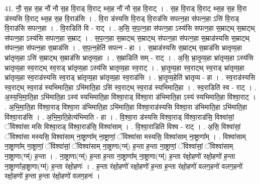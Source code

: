 \documentclass[17pt]{extarticle}
\begin{document}
41. नौ॒ स॒ह स॒ह नौ॑ नौ स॒ह वि॒राड् वि॒राट् थ्स॒ह नौ॑ नौ स॒ह वि॒राट् । . स॒ह वि॒राड् वि॒राट् थ्स॒ह स॒ह वि॒रा ड॑स्यसि वि॒राट् थ्स॒ह स॒ह वि॒राड॑सि । . वि॒रा ड॑स्यसि वि॒राड् वि॒राड॑सि सपत्न॒हा स॑पत्न॒हा ऽसि॑ वि॒राड् वि॒राड॑सि सपत्न॒हा । . वि॒राडिति॑ वि - राट् । . अ॒सि॒ स॒प॒त्न॒हा स॑पत्न॒हा ऽस्य॑सि सपत्न॒हा स॒म्राट्थ् स॒म्राट्थ् स॑पत्न॒हा ऽस्य॑सि सपत्न॒हा स॒म्राट् । . स॒प॒त्न॒हा स॒म्राट्थ् स॒म्राट्थ् स॑पत्न॒हा स॑पत्न॒हा स॒म्राड॑स्यसि स॒म्राट्थ् स॑पत्न॒हा स॑पत्न॒हा स॒म्राड॑सि । . स॒प॒त्न॒हेति॑ सपत्न - हा । . स॒म्राड॑स्यसि स॒म्राट्थ् स॒म्राड॑सि भ्रातृव्य॒हा भ्रा॑तृव्य॒हा ऽसि॑ स॒म्राट्थ् स॒म्राड॑सि भ्रातृव्य॒हा । . स॒म्राडिति॑ सम् - राट् । . अ॒सि॒ भ्रा॒तृ॒व्य॒हा भ्रा॑तृव्य॒हा ऽस्य॑सि भ्रातृव्य॒हा स्व॒राट्थ् स्व॒राड् भ्रा॑तृव्य॒हा ऽस्य॑सि भ्रातृव्य॒हा स्व॒राट् । . भ्रा॒तृ॒व्य॒हा स्व॒राट्थ् स्व॒राड् भ्रा॑तृव्य॒हा भ्रा॑तृव्य॒हा स्व॒राड॑स्यसि स्व॒राड् भ्रा॑तृव्य॒हा भ्रा॑तृव्य॒हा स्व॒राड॑सि । . भ्रा॒तृ॒व्य॒हेति॑ भ्रातृव्य - हा । . स्व॒राड॑स्यसि स्व॒राट्थ् स्व॒राड॑ स्यभिमाति॒हा ऽभि॑माति॒हा ऽसि॑ स्व॒राट्थ् स्व॒राड॑ स्यभिमाति॒हा । . स्व॒राडिति॑ स्व - राट् । . अ॒स्य॒भि॒मा॒ति॒हा ऽभि॑माति॒हा ऽस्य॑ स्यभिमाति॒हा वि॑श्वा॒राड् वि॑श्वा॒रा ड॑भिमाति॒हा ऽस्य॑ स्यभिमाति॒हा वि॑श्वा॒राट् । . अ॒भि॒मा॒ति॒हा वि॑श्वा॒राड् वि॑श्वा॒रा ड॑भिमाति॒हा ऽभि॑माति॒हा वि॑श्वा॒राड॑स्यसि विश्वा॒रा ड॑भिमाति॒हा ऽभि॑माति॒हा वि॑श्वा॒राड॑सि । . अ॒भि॒मा॒ति॒हेत्य॑भिमाति - हा । . वि॒श्वा॒रा ड॑स्यसि विश्वा॒राड् वि॑श्वा॒राड॑सि॒ विश्वा॑सां॒ ॅविश्वा॑सा मसि विश्वा॒राड् वि॑श्वा॒राड॑सि॒ विश्वा॑साम् । . वि॒श्वा॒राडिति॑ विश्व - राट् । . अ॒सि॒ विश्वा॑सां॒ ॅविश्वा॑सा मस्यसि॒ विश्वा॑साम् ना॒ष्ट्राणा᳚म् ना॒ष्ट्राणां॒ ॅविश्वा॑सा मस्यसि॒ विश्वा॑साम् ना॒ष्ट्राणा᳚म् । . विश्वा॑साम् ना॒ष्ट्राणा᳚म् ना॒ष्ट्राणां॒ ॅविश्वा॑सां॒ ॅविश्वा॑साम् ना॒ष्ट्राणा(ग्म्॑) ह॒न्ता ह॒न्ता ना॒ष्ट्राणां॒ ॅविश्वा॑सां॒ ॅविश्वा॑साम् ना॒ष्ट्राणा(ग्म्॑) ह॒न्ता । . ना॒ष्ट्राणा(ग्म्॑) ह॒न्ता ह॒न्ता ना॒ष्ट्राणा᳚म् ना॒ष्ट्राणा(ग्म्॑) ह॒न्ता र॑क्षो॒हणो॑ रक्षो॒हणो॑ ह॒न्ता ना॒ष्ट्राणा᳚न्ना॒ष्ट्राणा(ग्म्॑) ह॒न्ता र॑क्षो॒हणः॑ । . ह॒न्ता र॑क्षो॒हणो॑ रक्षो॒हणो॑ ह॒न्ता ह॒न्ता र॑क्षो॒हणो॑ वलग॒हनो॑ वलग॒हनो॑ रक्षो॒हणो॑ ह॒न्ता ह॒न्ता र॑क्षो॒हणो॑ वलग॒हनः॑ । \newline
\pagebreak
{}
\end{document}
